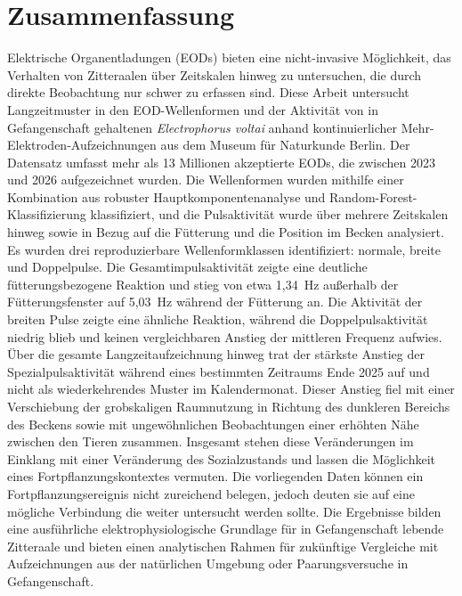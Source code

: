 \section{Zusammenfassung}

Elektrische Organentladungen (EODs) bieten eine nicht-invasive Möglichkeit, das Verhalten von Zitteraalen über Zeitskalen hinweg zu untersuchen, die durch direkte Beobachtung nur schwer zu erfassen sind.
Diese Arbeit untersucht Langzeitmuster in den EOD-Wellenformen und der Aktivität von in Gefangenschaft gehaltenen \textit{Electrophorus voltai} anhand kontinuierlicher Mehr-Elektroden-Aufzeichnungen aus dem Museum für Naturkunde Berlin.
Der Datensatz umfasst mehr als 13 Millionen akzeptierte EODs, die zwischen 2023 und 2026 aufgezeichnet wurden.
Die Wellenformen wurden mithilfe einer Kombination aus robuster Hauptkomponentenanalyse und Random-Forest-Klassifizierung klassifiziert, und die Pulsaktivität wurde über mehrere Zeitskalen hinweg sowie in Bezug auf die Fütterung und die Position im Becken analysiert.
Es wurden drei reproduzierbare Wellenformklassen identifiziert: normale, breite und Doppelpulse.
Die Gesamtimpulsaktivität zeigte eine deutliche fütterungsbezogene Reaktion und stieg von etwa 1,34~Hz außerhalb der Fütterungsfenster auf 5,03~Hz während der Fütterung an.
Die Aktivität der breiten Pulse zeigte eine ähnliche Reaktion, während die Doppelpulsaktivität niedrig blieb und keinen vergleichbaren Anstieg der mittleren Frequenz aufwies.
Über die gesamte Langzeitaufzeichnung hinweg trat der stärkste Anstieg der Spezialpulsaktivität während eines bestimmten Zeitraums Ende 2025 auf und nicht als wiederkehrendes Muster im Kalendermonat.
Dieser Anstieg fiel mit einer Verschiebung der grobskaligen Raumnutzung in Richtung des dunkleren Bereichs des Beckens sowie mit ungewöhnlichen Beobachtungen einer erhöhten Nähe zwischen den Tieren zusammen.
Insgesamt stehen diese Veränderungen im Einklang mit einer Veränderung des Sozialzustands und lassen die Möglichkeit eines Fortpflanzungskontextes vermuten. 
Die vorliegenden Daten können ein Fortpflanzungsereignis nicht zureichend belegen, jedoch deuten sie auf eine mögliche Verbindung die weiter untersucht werden sollte.
Die Ergebnisse bilden eine ausführliche elektrophysiologische Grundlage für in Gefangenschaft lebende Zitteraale und bieten einen analytischen Rahmen für zukünftige Vergleiche mit Aufzeichnungen aus der natürlichen Umgebung oder Paarungsversuche in Gefangenschaft.

\newpage